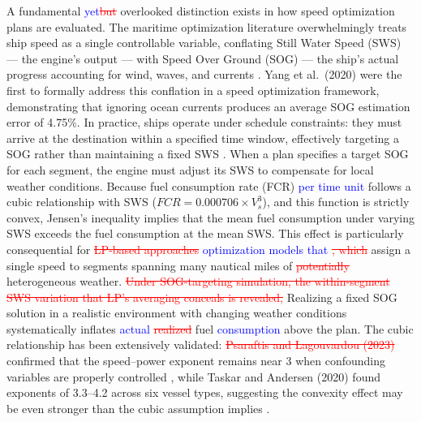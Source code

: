 \documentclass[review,authoryear]{elsarticle}  %
\newcommand{\revadd}[1]{\textcolor{blue}{#1}}
\newcommand{\revdel}[1]{\textcolor{red}{\sout{#1}}}
\begin{document}
A fundamental \revadd{yet}\revdel{but} overlooked distinction exists in how speed optimization plans are evaluated. The maritime optimization literature overwhelmingly treats ship speed as a single  controllable variable, conflating Still Water Speed (SWS) --- the engine's output --- with Speed Over Ground (SOG) --- the ship's actual progress accounting for wind, waves, and currents \citet{Yang2020}. Yang et al.\ (2020) were the first to formally address this conflation in a speed optimization framework, demonstrating that ignoring ocean currents produces an average SOG estimation error of 4.75\%. In practice, ships operate under schedule constraints: they must arrive at the destination within a specified time window, effectively targeting a SOG rather than maintaining a fixed SWS \citet{Jia2017,Huotari2021}. When a plan specifies a target SOG for each segment, the engine must adjust its SWS to compensate for local weather conditions. Because fuel consumption rate (FCR) \revadd{per time unit} follows a cubic relationship with SWS ($FCR = 0.000706 \times V_s^3$), and this function is strictly convex, Jensen's inequality implies that the mean fuel consumption under varying SWS exceeds the fuel consumption at the mean SWS. This effect is particularly consequential for \revdel{LP-based approaches}  \revadd{optimization models that} \revdel{, which} assign a single speed to segments spanning many nautical miles of \revdel{potentially }heterogeneous weather. \revdel{Under SOG-targeting simulation, the within-segment SWS variation that LP's averaging conceals is revealed,} Realizing a fixed SOG solution in a realistic environment with changing weather conditions systematically inflates \revadd{actual} \revdel{realized }fuel \revadd{consumption} above the plan. The cubic relationship has been extensively validated: \citet{Psaraftis2013}\revdel{Psaraftis and Lagouvardou (2023)}  confirmed that the speed--power exponent remains near 3 when confounding variables are properly controlled \citet{Psaraftis2023}, while Taskar and Andersen (2020) found exponents of 3.3--4.2 across six vessel types, suggesting the convexity effect may be even stronger than the cubic assumption implies \citet{Taskar2020}.
\end{document}
